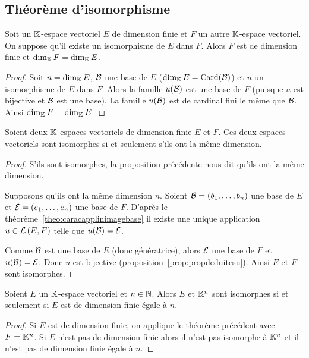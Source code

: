 \subsection{Théorème d'isomorphisme}

\begin{prop}
  Soit un \(\mathbb{K}\)-espace vectoriel \(E\) de dimension finie et \(F\) un autre \(\mathbb{K}\)-espace vectoriel. On suppose qu'il existe un isomorphisme de \(E\) dans \(F\). Alors \(F\) est de dimension finie et \(\operatorname{dim}_{\mathbb{K}} F = \operatorname{dim}_{\mathbb{K}} E\).
\end{prop}
\begin{proof}
  Soit \(n = \operatorname{dim}_{\mathbb{K}} E\), \(\mathcal{B}\) une base de \(E\) (\(\operatorname{dim}_{\mathbb{K}} E = \operatorname{Card}(\mathcal{B})\)) et \(u\) un isomorphisme de \(E\) dans \(F\). Alors la famille \(u(\mathcal{B})\) est une base de \(F\) (puisque \(u\) est bijective et \(\mathcal{B}\) est une base). La famille \(u(\mathcal{B})\) est de cardinal fini le même que \(\mathcal{B}\). Ainsi \(\operatorname{dim}_{\mathbb{K}} F = \operatorname{dim}_{\mathbb{K}} E\).
\end{proof}

\begin{theo}
  Soient deux \(\mathbb{K}\)-espaces vectoriels de dimension finie \(E\) et \(F\). Ces deux espaces vectoriels sont isomorphes si et seulement s'ils ont la même dimension.
\end{theo}
\begin{proof}
  S'ils sont isomorphes, la proposition précédente nous dit qu'ils ont la même dimension.

  Supposons qu'ils ont la même dimension \(n\). Soient \(\mathcal{B}=(b_1, \ldots, b_n)\) une base de \(E\) et \(\mathcal{E}=(e_1, \ldots, e_n)\) une base de \(F\). D'après le théorème~\ref{theo:caracapplinimagebase} il existe une unique application \(u \in \mathcal{L}\left(E,F\right)\) telle que \(u(\mathcal{B})=\mathcal{E}\).

  Comme \(\mathcal{B}\) est une base de \(E\) (donc génératrice), alors \(\mathcal{E}\) une base de \(F\) et \(u(\mathcal{B})=\mathcal{E}\). Donc \(u\) est bijective (proposition~\ref{prop:propdeduitesu}). Ainsi \(E\) et \(F\) sont isomorphes.
\end{proof}

\begin{corth}
  Soient \(E\) un \(\mathbb{K}\)-espace vectoriel et \(n \in \mathbb{N}\). Alors \(E\) et \(\mathbb{K}^n\) sont isomorphes si et seulement si \(E\) est de dimension finie égale à \(n\).
\end{corth}
\begin{proof}
  Si \(E\) est de dimension finie, on applique le théorème précédent avec \(F=\mathbb{K}^n\). Si \(E\) n'est pas de dimension finie alors il n'est pas isomorphe à \(\mathbb{K}^n\) et il n'est pas de dimension finie égale à \(n\).
\end{proof}

